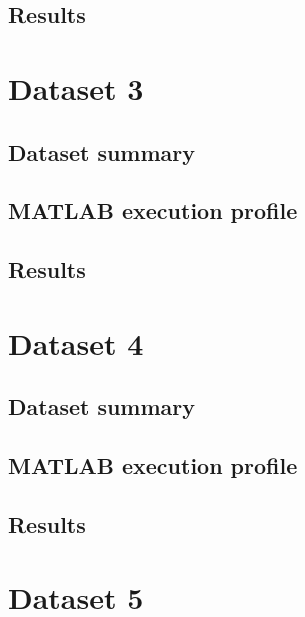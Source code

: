 \subsection{Results}

\section{Dataset 3}


\subsection{Dataset summary}

\subsection{MATLAB execution profile}

\subsection{Results}

\section{Dataset 4}


\subsection{Dataset summary}

\subsection{MATLAB execution profile}

\subsection{Results}

\section{Dataset 5}

